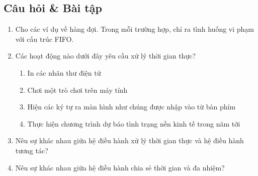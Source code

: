 \subsection*{Câu hỏi \& Bài tập}
\begin{enumerate}
\item Cho các ví dụ về hàng đợi. Trong mỗi trường hợp, chỉ ra tình
  huống vi phạm với cấu trúc FIFO.

\item Các hoạt động nào dưới đây yêu cầu xử lý thời gian thực?
  \begin{enumerate}
  \item In các nhãn thư điện tử

  \item Chơi một trò chơi trên máy tính

  \item Hiện các ký tự ra màn hình như chúng được nhập vào từ bàn phím

  \item Thực hiện chương trình dự báo tình trạng nền kinh tế trong năm
    tới
  \end{enumerate}

\item Nêu sự khác nhau giữa hệ điều hành xử lý thời gian thực và hệ
  điều hành tương tác?

\item Nêu sự khác nhau giữa hệ điều hành chia sẻ thời gian và đa nhiệm?
\end{enumerate}







